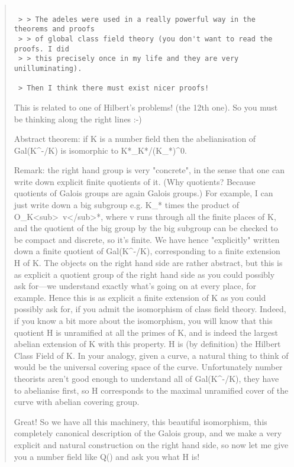 \begin{quote}

\begin{verbatim}

 > > The adeles were used in a really powerful way in the theorems and proofs
 > > of global class field theory (you don't want to read the proofs. I did
 > > this precisely once in my life and they are very unilluminating).

 > Then I think there must exist nicer proofs!
\end{verbatim}
    

 This is related to one of Hilbert's problems! (the 12th one). So you must
 be thinking along the right lines :-)

 Abstract theorem: if K is a number field then the abelianisation of
 Gal(K^{-}/K) is isomorphic to K*\Adeles_{K}*/(K_{\infty }*)^{0}.

 Remark: the right hand group is very "concrete", 
 in the sense that one can
 write down explicit finite quotients of it. (Why quotients? Because quotients
 of Galois groups are again Galois groups.) For example, I can
 just write down a big subgroup e.g. K_{\infty }* times the product of
 O_{K<sub>\ v}</sub>*, where v runs through all the finite places of K, and the
 quotient of the big group by the big subgroup can be checked to be compact
 and discrete, so it's finite. We have hence "explicitly" written down a
 finite quotient of Gal(K^{-}/K), corresponding to a finite extension H of K.
 The objects on the right hand side are rather abstract, but this is as
 explicit a quotient group of the right hand side as you could possibly ask for---we
 understand exactly what's going on at every place, for example. Hence this
 is as explicit a finite extension of K as you could possibly ask for, if
 you admit the isomorphism of class field theory. Indeed, if you know a bit
 more about the isomorphism, you will know that this quotient H is
 unramified at all the primes of K, and is indeed the largest
 abelian extension of K with this property. H is (by definition) the
 Hilbert Class Field of K. In your analogy, given a curve, a natural thing
 to think of would be the universal covering space of the curve.
 Unfortunately number theorists aren't good enough to understand all of
 Gal(K^{-}/K), they have to abelianise first, so H corresponds to the
 maximal unramified cover of the curve with abelian covering group.
 
 Great! So we have all this machinery, this beautiful isomorphism, this
 completely canonical description of the Galois group, and we make a very
 explicit and natural construction on the right hand side, so now let me
 give you a number field like Q() and ask you what H is!


\end{quote}
